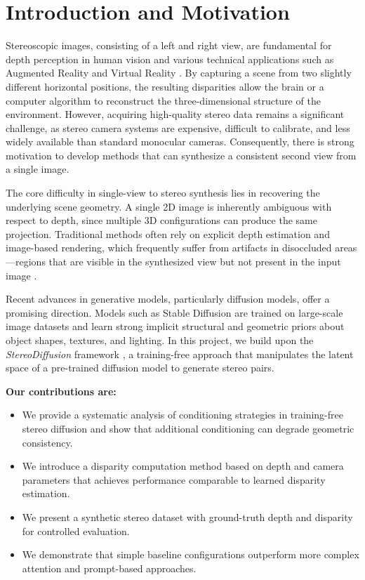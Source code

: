 \section{Introduction and Motivation} \label{introduction}

Stereoscopic images, consisting of a left and right view, are fundamental for depth perception in human vision and various technical applications such as Augmented Reality and Virtual Reality \citep{Wang-2024-stereodiffusion}. By capturing a scene from two slightly different horizontal positions, the resulting disparities allow the brain or a computer algorithm to reconstruct the three-dimensional structure of the environment. However, acquiring high-quality stereo data remains a significant challenge, as stereo camera systems are expensive, difficult to calibrate, and less widely available than standard monocular cameras. Consequently, there is strong motivation to develop methods that can synthesize a consistent second view from a single image.

The core difficulty in single-view to stereo synthesis lies in recovering the underlying scene geometry. A single 2D image is inherently ambiguous with respect to depth, since multiple 3D configurations can produce the same projection. Traditional methods often rely on explicit depth estimation and image-based rendering, which frequently suffer from artifacts in disoccluded areas—regions that are visible in the synthesized view but not present in the input image \citep{Wang-2024-stereodiffusion}.

Recent advances in generative models, particularly diffusion models, offer a promising direction. Models such as Stable Diffusion \citep{rombach2022highresolutionimagesynthesislatent} are trained on large-scale image datasets and learn strong implicit structural and geometric priors about object shapes, textures, and lighting. In this project, we build upon the \textit{StereoDiffusion} framework \citep{Wang-2024-stereodiffusion}, a training-free approach that manipulates the latent space of a pre-trained diffusion model to generate stereo pairs.

\textbf{Our contributions are:}
\begin{itemize}
\item We provide a systematic analysis of conditioning strategies in training-free stereo diffusion and show that additional conditioning can degrade geometric consistency.
\item We introduce a disparity computation method based on depth and camera parameters that achieves performance comparable to learned disparity estimation.
\item We present a synthetic stereo dataset with ground-truth depth and disparity for controlled evaluation.
\item We demonstrate that simple baseline configurations outperform more complex attention and prompt-based approaches.
\end{itemize}